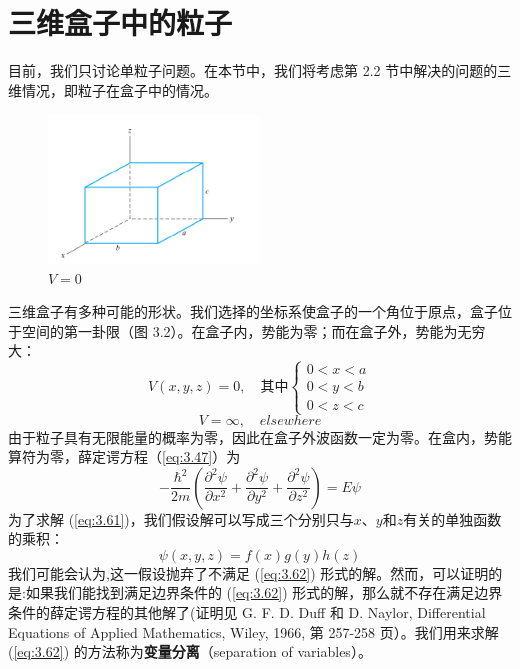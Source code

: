 \section{三维盒子中的粒子}
\label{sec:3.5 The Particle in a Three-Dimensional Box}
	目前，我们只讨论单粒子问题。在本节中，我们将考虑第 2.2 节中解决的问题的三维情况，即粒子在盒子中的情况。\\
	\begin{figure}[h!]
		\centering
		\includegraphics[width=0.5\textwidth]{Figures/3.2.png}  %
		\caption{$V=0$}
		\label{fig:3.2}
	\end{figure}
	\indent 三维盒子有多种可能的形状。我们选择的坐标系使盒子的一个角位于原点，盒子位于空间的第一卦限（图 3.2）。在盒子内，势能为零；而在盒子外，势能为无穷大：
	\begin{equation}
		V\left(x,y,z\right) = 0, \quad \text{其中}
		\begin{cases}
			0 < x < a\\
			0 < y < b\\
			0 < z < c
		\end{cases}
		\label{eq:3.60}
	\end{equation}
	\begin{equation*}
		V = \infty, \quad elsewhere
	\end{equation*}
	\indent 由于粒子具有无限能量的概率为零，因此在盒子外波函数一定为零。在盒内，势能算符为零，薛定谔方程（\ref{eq:3.47}）为
	\begin{equation}
		-\frac{\hbar^2}{2m}\left(\frac{\partial^2\psi}{\partial x^2} + \frac{\partial^2\psi}{\partial y^2} + \frac{\partial^2\psi}{\partial z^2}\right) = E\psi
		\label{eq:3.61}
	\end{equation}
	为了求解 (\ref{eq:3.61})，我们假设解可以写成三个分别只与$x$、$y$和$z$有关的单独函数的乘积：
	\begin{equation}
		\psi\left(x,y,z\right) = f\left(x\right)g\left(y\right)h\left(z\right)
		\label{eq:3.62}
	\end{equation}
	我们可能会认为,这一假设抛弃了不满足 (\ref{eq:3.62}) 形式的解。然而，可以证明的是:如果我们能找到满足边界条件的 (\ref{eq:3.62}) 形式的解，那么就不存在满足边界条件的薛定谔方程的其他解了(证明见 G. F. D. Duff 和 D. Naylor, Differential Equations of Applied Mathematics, Wiley, 1966, 第 257-258 页）。我们用来求解 (\ref{eq:3.62}) 的方法称为\textbf{变量分离}（separation of variables）。\\
